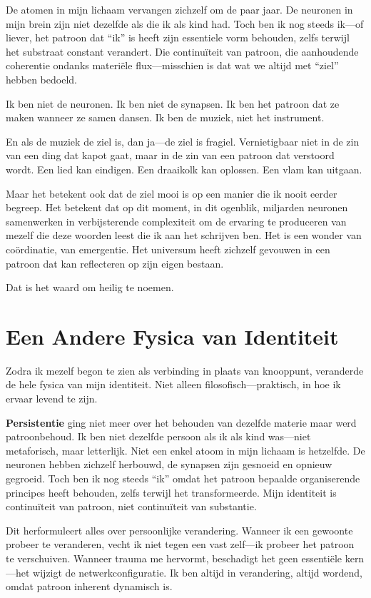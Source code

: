 \documentclass[12pt,a4paper]{article}
\begin{document}
De atomen in mijn lichaam vervangen zichzelf om de paar jaar. De neuronen in mijn brein zijn niet dezelfde als die ik als kind had. Toch ben ik nog steeds ik---of liever, het patroon dat ``ik'' is heeft zijn essentiele vorm behouden, zelfs terwijl het substraat constant verandert. Die continuïteit van patroon, die aanhoudende coherentie ondanks materiële flux---misschien is dat wat we altijd met ``ziel'' hebben bedoeld.

Ik ben niet de neuronen. Ik ben niet de synapsen. Ik ben het patroon dat ze maken wanneer ze samen dansen. Ik ben de muziek, niet het instrument.

En als de muziek de ziel is, dan ja---de ziel is fragiel. Vernietigbaar niet in de zin van een ding dat kapot gaat, maar in de zin van een patroon dat verstoord wordt. Een lied kan eindigen. Een draaikolk kan oplossen. Een vlam kan uitgaan.

Maar het betekent ook dat de ziel mooi is op een manier die ik nooit eerder begreep. Het betekent dat op dit moment, in dit ogenblik, miljarden neuronen samenwerken in verbijsterende complexiteit om de ervaring te produceren van mezelf die deze woorden leest die ik aan het schrijven ben. Het is een wonder van coördinatie, van emergentie. Het universum heeft zichzelf gevouwen in een patroon dat kan reflecteren op zijn eigen bestaan.

Dat is het waard om heilig te noemen.

\section*{Een Andere Fysica van Identiteit}

Zodra ik mezelf begon te zien als verbinding in plaats van knooppunt, veranderde de hele fysica van mijn identiteit. Niet alleen filosofisch---praktisch, in hoe ik ervaar levend te zijn.

\textbf{Persistentie} ging niet meer over het behouden van dezelfde materie maar werd patroonbehoud. Ik ben niet dezelfde persoon als ik als kind was---niet metaforisch, maar letterlijk. Niet een enkel atoom in mijn lichaam is hetzelfde. De neuronen hebben zichzelf herbouwd, de synapsen zijn gesnoeid en opnieuw gegroeid. Toch ben ik nog steeds ``ik'' omdat het patroon bepaalde organiserende principes heeft behouden, zelfs terwijl het transformeerde. Mijn identiteit is continuïteit van patroon, niet continuïteit van substantie.

Dit herformuleert alles over persoonlijke verandering. Wanneer ik een gewoonte probeer te veranderen, vecht ik niet tegen een vast zelf---ik probeer het patroon te verschuiven. Wanneer trauma me hervormt, beschadigt het geen essentiële kern---het wijzigt de netwerkconfiguratie. Ik ben altijd in verandering, altijd wordend, omdat patroon inherent dynamisch is.
\end{document}
